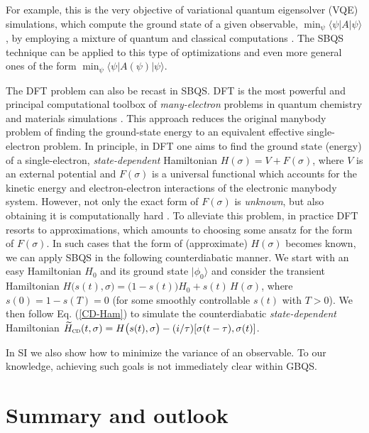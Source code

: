 \documentclass[aps,pra,twocolumn,floatfix,groupedaddress,superscriptaddress,nofootinbib,notitlepage]{revtex4-2}
\begin{document}
For example, this is the very objective of variational quantum eigensolver (VQE) simulations, which compute the ground state of a given observable, $\min_{\psi}\langle \psi|A|\psi\rangle$, by employing a mixture of quantum and classical computations \cite{NISQ-, VQE-rev, VQE-state, HF-Google}. The SBQS technique can be applied to this type of optimizations and even more general ones of the form $\min_{\psi}\langle\psi|A(\psi)|\psi\rangle$. 

The DFT problem \cite{DFT-NL} can also be recast in SBQS. DFT is the most powerful and principal computational toolbox of \textit{many-electron} problems in quantum chemistry and materials simulations \cite{DFT-hard, Hastings, Miessen, DFT-QC, Qmanybody}. This approach reduces the original manybody problem of finding the ground-state energy to an equivalent effective single-electron problem. In principle, in DFT one aims to find the ground state (energy) of a single-electron, \textit{state-dependent} Hamiltonian $H(\sigma) = V + F(\sigma)$, where $V$ is an external potential and $F(\sigma)$ is a universal functional which accounts for the kinetic energy and electron-electron interactions of the electronic manybody system. However, not only the exact form of $F(\sigma)$ is \textit{unknown}, but also obtaining it is computationally hard \cite{DFT-hard}. To alleviate this problem, in practice DFT resorts to approximations, which amounts to choosing some ansatz for the form of $F(\sigma)$. In such cases that the form of (approximate) $H(\sigma)$ becomes known, we can apply SBQS in the following counterdiabatic manner. We start with an easy Hamiltonian $H_{0}$ and its ground state $|\phi_{0}\rangle$ and consider the transient Hamiltonian $H \big(s(t),\sigma\big) = \big(1-s(t)\big) H_{0} + s(t) \, H(\sigma)$, where $s(0)=1-s(T)=0$ (for some smoothly controllable $s(t)$ with $T>0$). We then follow Eq. (\ref{CD-Ham}) to simulate the counterdiabatic \textit{state-dependent} Hamiltonian $\widetilde{H}_{\textsc{cd}}(t,\sigma) = H\big(s(t),\sigma\big) - (i/\tau)[\sigma(t-\tau), \sigma(t)]$. 

In SI we also show how to minimize the variance of an observable. To our knowledge, achieving such goals is not immediately clear within GBQS. 

\section{Summary and outlook}
\label{sec:outlook}
\end{document}
